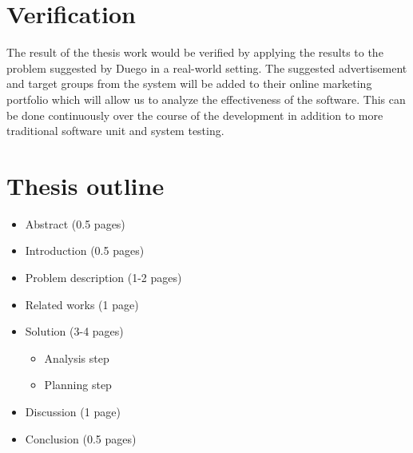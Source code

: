\documentclass[a4paper]{article}
\begin{document}
\section{Verification}
The result of the thesis work would be verified by applying the results to the problem suggested by Duego in a real-world setting.
The suggested advertisement and target groups from the system will be added to their online marketing portfolio which will allow
us to analyze the effectiveness of the software. This can be done continuously over the course of the development in addition to
more traditional software unit and system testing.

\section{Thesis outline}
\begin{itemize}
	\item Abstract (0.5 pages)
	\item Introduction (0.5 pages)
	\item Problem description (1-2 pages)
	\item Related works (1 page)
	\item Solution (3-4 pages)
	\begin{itemize}
		\item Analysis step
		\item Planning step
	\end{itemize}
	\item Discussion (1 page)
	\item Conclusion (0.5 pages)
\end{itemize}


\end{document}
